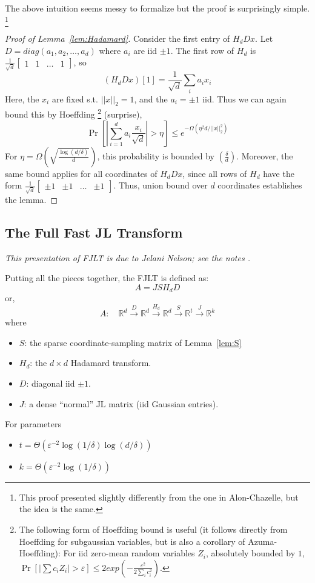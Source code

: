 \documentclass[]{article}
\newcommand{\1}{\mathbb{1}}
\newcommand{\x}{\times}
\newcommand{\R}{\mathbb{R}}
\renewcommand{\epsilon}{\varepsilon}
\newcommand{\bmqty}[1]{\begin{bmatrix}#1\end{bmatrix}}
\begin{document}
The above intuition seems messy to formalize
but the proof is surprisingly simple.
\footnote{This proof presented slightly differently from the one in
Alon-Chazelle, but the idea is the same.}

\begin{proof}[Proof of Lemma~\ref{lem:Hadamard}]
Consider the first entry of $H_d D x$.
Let $D = diag(a_1, a_2, \dots, a_d)$ where $a_i$ are iid $\pm 1$.
The first row of $H_d$ is
$\frac{1}{\sqrt{d}} \bmqty{1 & 1 & \dots & 1}$, so
$$(H_d D x)[1] =
\frac{1}{\sqrt{d}}
\sum_i a_ix_i$$
Here, the $x_i$ are fixed s.t. $||x||_2=1$, and the $a_i = \pm 1$ iid.
Thus we can again bound this by Hoeffding
\footnote{
    The following form of Hoeffding bound is useful (it follows directly from
    Hoeffding for subgaussian variables, but is also a corollary of
    Azuma-Hoeffding):
    For iid zero-mean random variables $Z_i$, absolutely bounded by $1$,
    $\Pr[|\sum c_i Z_i| > \epsilon]
    \leq 2exp(-\frac{\epsilon^2}{2 \sum_i c_i^2})$.
}
    (surprise),
$$
\Pr[
|
\sum_{i=1}^d a_i \frac{x_i}{\sqrt{d}}|
> \eta]
\leq
e^{-\Omega(\eta^2 d / ||x||_2^2)}
$$
For $\eta = \Omega(\sqrt{\frac{\log(d/\delta)}{d}})$,
this probability is bounded by $(\frac{\delta}{d})$.
Moreover, the same bound applies for all coordinates of
$H_d Dx$, since all rows of $H_d$ have the form
$\frac{1}{\sqrt{d}} \bmqty{\pm 1 & \pm1 & \dots & \pm1}$.
Thus, union bound over $d$ coordinates establishes the lemma.
\end{proof}

\subsection{The Full Fast JL Transform}
{\it This presentation of FJLT is due to Jelani Nelson; see the notes \cite{jlnotes}.}

Putting all the pieces together,
the FJLT is defined as:
$$A = J S H_d D$$
or,
$$
A: \quad
\R^d
\overset{D}{\longrightarrow}
\R^d
\overset{H_d}{\longrightarrow}
\R^d
\overset{S}{\longrightarrow}
\R^t
\overset{J}{\longrightarrow}
\R^k
$$
where
\begin{itemize}
    \item $S$: the sparse coordinate-sampling matrix of Lemma~\ref{lem:S}
    \item $H_d$: the $d \x d$ Hadamard transform.
    \item $D$: diagonal iid $\pm 1$.
    \item $J$: a dense ``normal'' JL matrix (iid Gaussian entries).
\end{itemize}
For parameters
\begin{itemize}
    \item $t = \Theta(\epsilon^{-2}\log(1/\delta)\log(d / \delta))$
    \item $k = \Theta(\epsilon^{-2}\log(1/\delta))$
\end{itemize}
\end{document}
